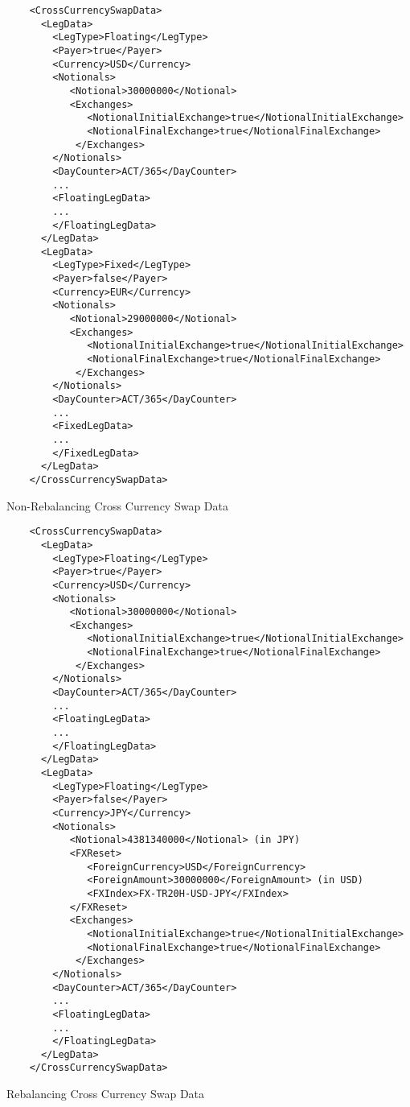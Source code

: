 \begin{listing}[H]
\begin{verbatim}
    <CrossCurrencySwapData>
      <LegData>
        <LegType>Floating</LegType>
        <Payer>true</Payer>
        <Currency>USD</Currency>
        <Notionals>
           <Notional>30000000</Notional>
           <Exchanges>
              <NotionalInitialExchange>true</NotionalInitialExchange>
              <NotionalFinalExchange>true</NotionalFinalExchange>
            </Exchanges>
        </Notionals>
        <DayCounter>ACT/365</DayCounter>
        ...
        <FloatingLegData>
        ...
        </FloatingLegData>
      </LegData>
      <LegData>
        <LegType>Fixed</LegType>
        <Payer>false</Payer>
        <Currency>EUR</Currency>
        <Notionals>
           <Notional>29000000</Notional>
           <Exchanges>
              <NotionalInitialExchange>true</NotionalInitialExchange>
              <NotionalFinalExchange>true</NotionalFinalExchange>
            </Exchanges>
        </Notionals>        
        <DayCounter>ACT/365</DayCounter>
        ...
        <FixedLegData>
        ...
        </FixedLegData>
      </LegData>
    </CrossCurrencySwapData>
\end{verbatim}
\caption{Non-Rebalancing Cross Currency Swap Data}
\label{lst:crosscurrencyswapnonreset}
\end{listing}

\begin{listing}[H]
\begin{verbatim}
    <CrossCurrencySwapData>
      <LegData>
        <LegType>Floating</LegType>
        <Payer>true</Payer>
        <Currency>USD</Currency>
        <Notionals>
           <Notional>30000000</Notional>
           <Exchanges>
              <NotionalInitialExchange>true</NotionalInitialExchange>
              <NotionalFinalExchange>true</NotionalFinalExchange>
            </Exchanges>
        </Notionals>
        <DayCounter>ACT/365</DayCounter>
        ...
        <FloatingLegData>
        ...
        </FloatingLegData>
      </LegData>
      <LegData>
        <LegType>Floating</LegType>
        <Payer>false</Payer>
        <Currency>JPY</Currency>
        <Notionals>
           <Notional>4381340000</Notional> (in JPY)
           <FXReset>
              <ForeignCurrency>USD</ForeignCurrency>
              <ForeignAmount>30000000</ForeignAmount> (in USD)
              <FXIndex>FX-TR20H-USD-JPY</FXIndex>
           </FXReset>
           <Exchanges>
              <NotionalInitialExchange>true</NotionalInitialExchange>
              <NotionalFinalExchange>true</NotionalFinalExchange>
            </Exchanges>
        </Notionals> 
        <DayCounter>ACT/365</DayCounter>
        ...
        <FloatingLegData>
        ...
        </FloatingLegData>
      </LegData>
    </CrossCurrencySwapData>
\end{verbatim}
\caption{Rebalancing Cross Currency Swap Data}
\label{lst:crosscurrencyswapreset}
\end{listing}


